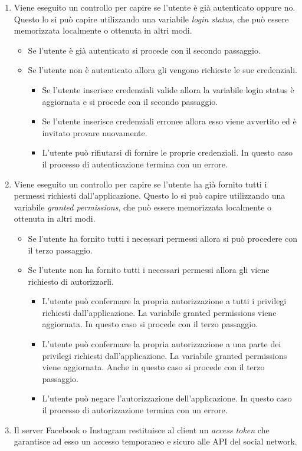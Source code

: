				\begin{enumerate}
					\item Viene eseguito un controllo per capire se l'utente è già autenticato oppure no. Questo lo si può capire
					utilizzando una variabile \emph{login status}, che può essere memorizzata localmente o ottenuta in altri
					modi.
					\begin{itemize}
						\item Se l'utente è già autenticato si procede con il secondo passaggio.
						\item Se l'utente non è autenticato allora gli vengono richieste le sue credenziali.
						\begin{itemize}
							\item Se l'utente inserisce credenziali valide allora la variabile login status è aggiornata
							e si procede con il secondo passaggio.
							\item Se l'utente inserisce credenziali erronee allora esso viene avvertito ed è invitato
							provare nuovamente.
							\item L'utente può rifiutarsi di fornire le proprie credenziali. In questo caso il processo
							di autenticazione termina con un errore.
						\end{itemize}
					\end{itemize}
					\item Viene eseguito un controllo per capire se l'utente ha già fornito tutti i permessi richiesti
					dall'applicazione. Questo lo si può capire utilizzando una variabile \emph{granted permissions}, che può
					essere memorizzata localmente o ottenuta in altri modi.
					\begin{itemize}
						\item Se l'utente ha fornito tutti i necessari permessi allora si può procedere con il terzo
						passaggio.
						\item Se l'utente non ha fornito tutti i necessari permessi allora gli viene richiesto di
						autorizzarli.
						\begin{itemize}
							\item L'utente può confermare la propria autorizzazione a tutti i privilegi richiesti
							dall'applicazione. La variabile granted permissions viene aggiornata. In questo caso si
							procede con il terzo passaggio.
							\item L'utente può confermare la propria autorizzazione a una parte dei privilegi richiesti
							dall'applicazione. La variabile granted permissions viene aggiornata. Anche in questo caso
							si procede con il terzo passaggio.
							\item L'utente può negare l'autorizzazione dell'applicazione. In questo caso il processo di
							autorizzazione termina con un errore.
						\end{itemize}
					\end{itemize}
					\item Il server Facebook o Instagram restituisce al client un \emph{access token} che garantisce ad esso un
					accesso temporaneo e sicuro alle API del social network.
				\end{enumerate}
